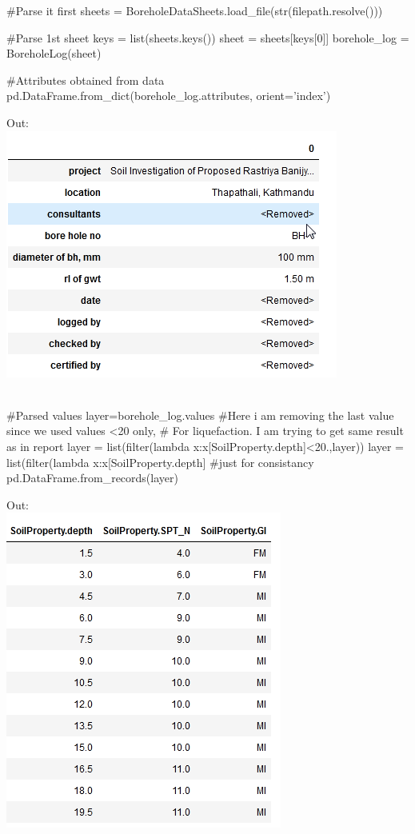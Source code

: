 \begin{python}
#Parse it first
sheets = BoreholeDataSheets.load_file(str(filepath.resolve()))
\end{python}

\begin{python}
#Parse 1st sheet
keys = list(sheets.keys())
sheet = sheets[keys[0]]
borehole_log = BoreholeLog(sheet)
\end{python}

\begin{python}
#Attributes obtained from data
pd.DataFrame.from_dict(borehole_log.attributes, orient='index')
\end{python}
Out:\\
\includegraphics[]{./images/sample/fv.png}\\\\

\begin{python}
#Parsed values
layer=borehole_log.values
#Here i am removing the last value since we used values <20 only,
# For liquefaction. I am trying to get same result as in report
layer = list(filter(lambda x:x[SoilProperty.depth]<20.,layer))
layer = list(filter(lambda x:x[SoilProperty.depth]%
#just for consistancy
pd.DataFrame.from_records(layer)
\end{python}
Out:\\
\includegraphics[]{./images/sample/p1.png}\\\\

